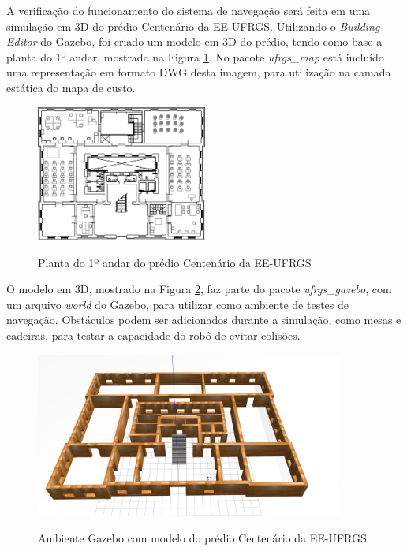 \documentclass[repeatfields,xlists,xpacks,oneside,yearsonly]{ufrgscca}
\begin{document}
A verificação do funcionamento do sistema de navegação será feita em uma simulação
em 3D do prédio Centenário da EE-UFRGS.
Utilizando o \textit{Building Editor} do Gazebo, foi criado um modelo em 3D do prédio,
tendo como base a planta do 1º andar, mostrada na Figura \ref{fig:planta_centenario}.
No pacote \textit{ufrgs\_map} está incluído uma representação em formato DWG desta
imagem, para utilização na camada estática do mapa de custo.

\begin{figure}[htbp]
    {
        \centering
        \caption{Planta do 1º andar do prédio Centenário da EE-UFRGS}
        \label{fig:planta_centenario}
        \includegraphics[width=0.5\textwidth]{centenario_floor_plan.png}\\
    }
    {}
\end{figure}

O modelo em 3D, mostrado na Figura \ref{fig:gazebo_centenario}, faz parte do pacote
\textit{ufrgs\_gazebo}, com um arquivo \textit{world} do Gazebo,
para utilizar como ambiente de testes de navegação.
Obstáculos podem ser adicionados durante a simulação, como mesas e cadeiras,
para testar a capacidade do robô de evitar colisões.

\begin{figure}[htbp]
    {
        \centering
        \caption{Ambiente Gazebo com modelo do prédio Centenário da EE-UFRGS}
        \label{fig:gazebo_centenario}
        \includegraphics[width=0.9\textwidth]{gazebo.png}\\
    }
    {}
\end{figure}
\end{document}
